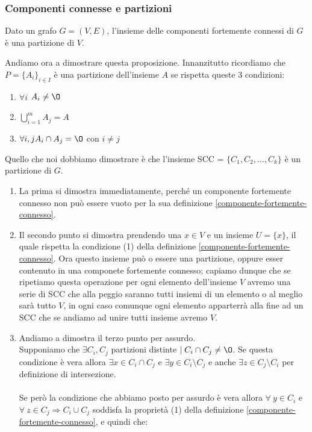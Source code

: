 \subsubsection{Componenti connesse e partizioni}
\begin{proposition}
    Dato un grafo $G=(V,E)$, l'insieme delle componenti fortemente connessi di $G$ è una partizione di $V$.
\end{proposition}
\begin{demostration}
Andiamo ora a dimostrare questa proposizione. Innanzitutto ricordiamo che $P = \{A_i\}_{i \in I}$ è una partizione dell'insieme $A$ se rispetta queste 3 condizioni:
\begin{enumerate}
    \item $\forall i$ $A_i \neq \O$
    \item $\bigcup^m_{i=1}A_j = A$
    \item $\forall i, j A_i \cap A_j = \O$ con $i \neq j$
\end{enumerate}
Quello che noi dobbiamo dimostrare è che l'insieme SCC = $\{C_1, C_2, \ldots, C_k\}$ è un partizione di $G$.
\begin{enumerate}
    \item La prima si dimostra immediatamente, perché un componente fortemente connesso non può essere vuoto per la sua definizione \ref{componente-fortemente-connesso}.
    \item Il secondo punto si dimostra prendendo una $x \in V$ e un insieme $U = \{x\}$, il quale rispetta la condizione (1) della definizione \ref{componente-fortemente-connesso}. Ora questo insieme può o essere una partizione, oppure esser contenuto in una componete fortemente connesso; capiamo dunque che se ripetiamo questa operazione per ogni elemento dell'insieme $V$ avremo una serie di SCC che alla peggio saranno tutti insiemi di un elemento o al meglio sarà tutto $V$, in ogni caso comunque ogni elemento apparterrà alla fine ad un SCC che se andiamo ad unire tutti insieme avremo $V$.
    \item Andiamo a dimostra il terzo punto per assurdo.\\ 
    Supponiamo che $\exists C_i, C_j$ partizioni distinte $\mid C_i \cap C_j \neq \O$. Se questa condizione è vera allora $\exists x \in C_i \cap C_j$ e $\exists y \in C_i \setminus C_j$ e anche $\exists z \in C_j \setminus C_i$ per definizione di intersezione.\\\\
    Se però la condizione che abbiamo posto per assurdo è vera allora $\forall \: y \in C_i$ e $\forall \: z \in C_j \Longrightarrow C_i \cup C_j$ soddisfa la proprietà (1) della definizione \ref{componente-fortemente-connesso}, e quindi che:\\

\end{enumerate}
\end{demostration}
